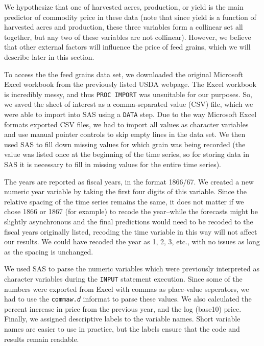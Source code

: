 \documentclass[11pt]{article}
\begin{document}
We hypothesize that one of harvested acres, production, or yield is the main
predictor of commodity price in these data (note that since yield is a function
of harvested acres and production, these three variables form a collinear set
all together, but any two of these variables are not collinear). However, we
believe that other external factors will influence the price of feed grains,
which we will describe later in this section.

To access the the feed grains data set, we downloaded the original Microsoft
Excel workbook from the previously listed USDA webpage. The Excel workbook is
incredibly messy, and thus \texttt{PROC IMPORT} was unsuitable for our
purposes. So, we saved the sheet of interest as a comma-separated value (CSV)
file, which we were able to import into SAS using a \texttt{DATA} step. Due to
the way Microsoft Excel formats exported CSV files, we had to import all values
as character variables and use manual pointer controls to skip empty lines in
the data set. We then used SAS to fill down missing values for which grain was
being recorded (the value was listed once at the beginning of the time series,
so for storing data in SAS it is necessary to fill in missing values for the
entire time series).

The years are reported as fiscal years, in the format 1866/67. We created a new
numeric year variable by taking the first four digits of this variable. Since
the relative spacing of the time series remains the same, it does not matter if
we chose 1866 or 1867 (for example) to recode the year--while the forecasts
might be slightly asynchronous and the final predictions would need to be
recoded to the fiscal years originally listed, recoding the time variable in
this way will not affect our results. We could have recoded the year as 1, 2,
3, etc., with no issues as long as the spacing is unchanged.

We used SAS to parse the numeric variables which were previously interpreted as
character variables during the \texttt{INPUT} statement execution. Since some
of the numbers were exported from Excel with commas as place-value seperators,
we had to use the \texttt{comma\textit{w}.\textit{d}} informat to parse these
values. We also calculated the percent increase in price from the previous
year, and the log (base10) price. Finally, we assigned descriptive labels to
the variable names. Short variable names are easier to use in practice, but the
labels ensure that the code and results remain readable.
\end{document}
